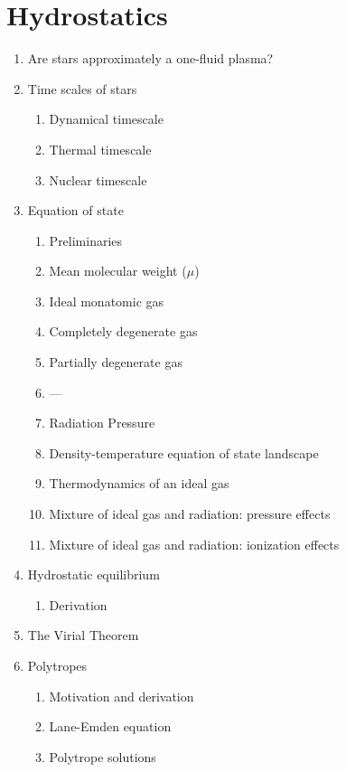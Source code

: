 \documentclass{article}
\begin{document}
\section{Hydrostatics}
\begin{enumerate}
    \item Are stars approximately a one-fluid plasma?
    \item Time scales of stars
        \begin{enumerate}
            \item Dynamical timescale
            \item Thermal timescale
            \item Nuclear timescale
        \end{enumerate}
    \item Equation of state
        \begin{enumerate}
            \item Preliminaries
            \item Mean molecular weight (${\mu}$)
            \item Ideal monatomic gas
            \item Completely degenerate gas
            \item Partially degenerate gas
            \item ---
            \item Radiation Pressure
            \item Density-temperature equation of state landscape
            \item Thermodynamics of an ideal gas
            \item Mixture of ideal gas and radiation: pressure effects
            \item Mixture of ideal gas and radiation: ionization effects
        \end{enumerate}
    \item Hydrostatic equilibrium
        \begin{enumerate}
            \item Derivation
        \end{enumerate}
    \item The Virial Theorem
    \item Polytropes
        \begin{enumerate}
            \item Motivation and derivation
            \item Lane-Emden equation
            \item Polytrope solutions
        \end{enumerate}
\end{enumerate}
\newpage
\end{document}
